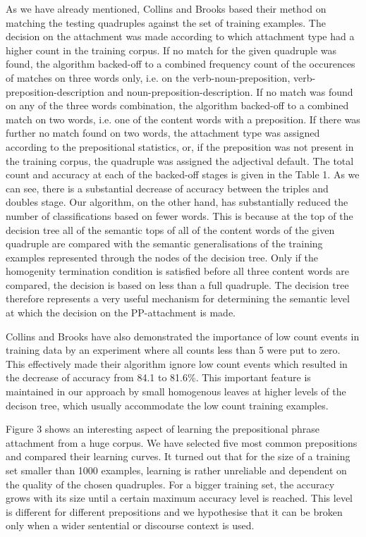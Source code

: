 As we have already mentioned, Collins and Brooks \cite{CandB95} based their method on matching the testing quadruples against the set of training examples. The decision on the attachment was made according to which attachment type had a higher count in the training corpus. If no match for the given quadruple was found, the algorithm backed-off to a combined frequency count of the occurences of matches on three words only, i.e. on the verb-noun-preposition, verb-preposition-description and noun-preposition-description. If no match was found on any of the three words combination, the algorithm backed-off to a combined match on two words, i.e. one of the content words with a preposition. If there was further no match found on two words, the attachment type was assigned according to the prepositional statistics, or, if the preposition was not present in the training corpus, the quadruple was assigned the adjectival default. The total count and accuracy at each of the backed-off stages is given in the Table 1. As we can see, there is a substantial decrease of accuracy between the triples and doubles stage. Our algorithm, on the other hand, has substantially reduced the number of classifications based on fewer words. This is because at the top of the decision tree all of the semantic tops of all of the content words of the given quadruple are compared with the semantic generalisations of the training examples represented through the nodes of the decision tree. Only if the homogenity termination condition is satisfied before all three content words are compared, the decision is based on less than a full quadruple. The decision tree therefore represents a very useful mechanism for determining the semantic level at which the decision on the PP-attachment is made.

Collins and Brooks have also demonstrated the importance of low count events in training data by an experiment where all counts less than 5 were put to zero. This effectively made their algorithm ignore low count events which resulted in the decrease of accuracy from 84.1 to 81.6\%. This important feature is maintained in our approach by small homogenous leaves at higher levels of the decison tree, which usually accommodate the low count training examples.

Figure 3 shows an interesting aspect of learning the prepositional phrase attachment from a huge corpus. We have selected five most common prepositions and compared their learning curves. It turned out that for the size of a training set smaller than 1000 examples, learning is rather unreliable and dependent on the quality of the chosen quadruples. For a bigger training set, the accuracy grows with its size until a certain maximum accuracy level is reached. This level is different for different prepositions and we hypothesise that it can be broken only when a wider sentential or discourse context is used.

